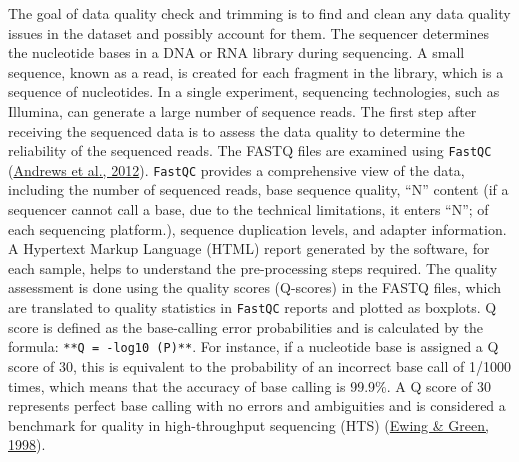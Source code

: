 \documentclass[12pt,twoside]{reedthesis}
\begin{document}
The goal of data quality check and trimming is to find and clean any
data quality issues in the dataset and possibly account for them. The
sequencer determines the nucleotide bases in a DNA or RNA library during
sequencing. A small sequence, known as a read, is created for each
fragment in the library, which is a sequence of nucleotides. In a single
experiment, sequencing technologies, such as Illumina, can generate a
large number of sequence reads. The first step after receiving the
sequenced data is to assess the data quality to determine the
reliability of the sequenced reads. The FASTQ files are examined using
\texttt{FastQC} (\protect\hyperlink{ref-andrews2012}{Andrews et al., 2012}). \texttt{FastQC} provides a comprehensive view of the
data, including the number of sequenced reads, base sequence quality,
``N'' content (if a sequencer cannot call a base, due to the technical
limitations, it enters ``N''; of each sequencing platform.), sequence
duplication levels, and adapter information. A Hypertext Markup Language
(HTML) report generated by the software, for each sample, helps to
understand the pre-processing steps required. The quality assessment is
done using the quality scores (Q-scores) in the FASTQ files, which are
translated to quality statistics in \texttt{FastQC} reports and plotted as
boxplots. Q score is defined as the base-calling error probabilities and
is calculated by the formula: \texttt{**Q\ =\ -log10\ (P)**}. For instance, if a
nucleotide base is assigned a Q score of 30, this is equivalent to the
probability of an incorrect base call of 1/1000 times, which means that
the accuracy of base calling is 99.9\%. A Q score of 30 represents
perfect base calling with no errors and ambiguities and is considered a
benchmark for quality in high-throughput sequencing (HTS) (\protect\hyperlink{ref-ewing1998}{Ewing \& Green, 1998}).
\end{document}
